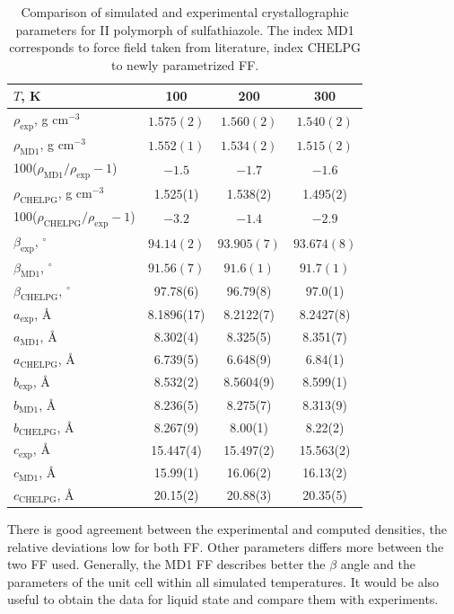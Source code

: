     \begin{table}[htb]   
    \caption{Comparison of simulated and experimental \cite{drebushchak_crystal_2008} crystallographic parameters for II polymorph of sulfathiazole. The index MD1 corresponds to force field taken from literature, index CHELPG to newly parametrized FF.}    
	\centering
	\begin{tabular}{lccc}
		\toprule
		$T$, K & 100 & 200 & 300\\
		\midrule
		$\rho_\mathrm{exp}$, g cm$^{-3}$  & $1.575(2)$ & $1.560(2)$ & $1.540(2)$\\
		$\rho_\mathrm{MD1}$, g cm$^{-3}$ & $1.552(1)$ & $1.534(2)$ & $1.515(2)$\\
		100($\rho_\mathrm{MD1}/\rho_\mathrm{exp}-1$) & $-1.5$ & $-1.7$ & $-1.6$\\
		$\rho_\mathrm{CHELPG}$, g cm$^{-3}$ & 1.525(1) & 1.538(2) & 1.495(2)  \\
		100($\rho_\mathrm{CHELPG}/\rho_\mathrm{exp}-1$) & $-3.2$ & $-1.4$ & $-2.9$\\
		\midrule
		$\beta_\mathrm{exp}$, $^{\circ}$ & $94.14(2)$ & $93.905(7)$ & $93.674(8)$\\
		$\beta_\mathrm{MD1}$, $^{\circ}$ & $91.56(7)$ & $91.6(1)$ & $91.7(1)$\\
		$\beta_\mathrm{CHELPG}$, $^{\circ}$ & 97.78(6) & 96.79(8) & 97.0(1)\\
		\midrule
		$a_\mathrm{exp}$, \AA & 8.1896(17) & 8.2122(7) & 8.2427(8)\\
		$a_\mathrm{MD1}$, \AA & 8.302(4) & 8.325(5) & 8.351(7) \\
		$a_\mathrm{CHELPG}$, \AA & 6.739(5) & 6.648(9) & 6.84(1) \\
		\midrule
		$b_\mathrm{exp}$, \AA & 8.532(2) & 8.5604(9) & 8.599(1) \\
		$b_\mathrm{MD1}$, \AA & 8.236(5) & 8.275(7) & 8.313(9) \\
		$b_\mathrm{CHELPG}$, \AA & 8.267(9) & 8.00(1) &	8.22(2) \\
		\midrule
		$c_\mathrm{exp}$, \AA  & 15.447(4) & 15.497(2) & 15.563(2) \\
		$c_\mathrm{MD1}$, \AA & 15.99(1) & 16.06(2) & 16.13(2) \\
		$c_\mathrm{CHELPG}$, \AA & 20.15(2) & 20.88(3) & 20.35(5)\\
		\bottomrule
	\end{tabular}
	\label{tab:sulfathiazol}
\end{table}

There is good agreement between the experimental and computed densities, the relative deviations low for both FF. Other parameters differs more between the two FF used. Generally, the MD1 FF describes better the $\beta$ angle and the parameters of the unit cell within all simulated temperatures. It would be also useful to obtain the data for liquid state and compare them with experiments.

